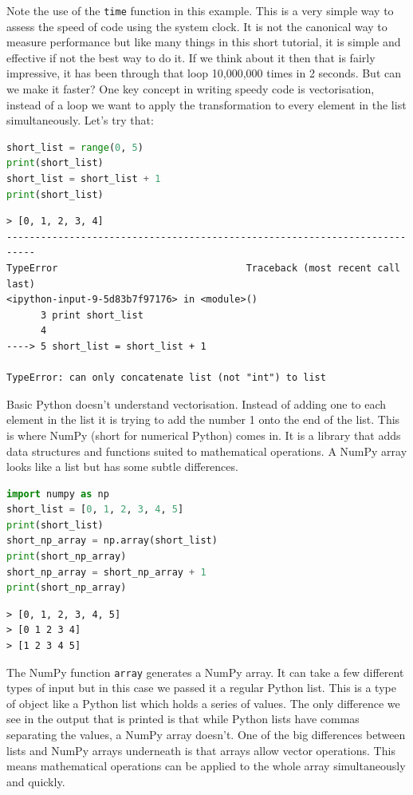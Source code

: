 	Note the use of the \texttt{time} function in this example. This is a very simple way to assess the speed of code using the system clock. It is not the canonical way to measure performance but like many things in this short tutorial, it is simple and effective if not the best way to do it.
	If we think about it then that is fairly impressive, it has been through that loop 10,000,000 times in 2 seconds. But can we make it faster? One key concept in writing speedy code is vectorisation, instead of a loop we want to apply the transformation to every element in the list simultaneously. Let's try that:

	\begin{lstlisting}[language=Python]
short_list = range(0, 5)
print(short_list)
short_list = short_list + 1
print(short_list)\end{lstlisting}

	\begin{verbatim}
> [0, 1, 2, 3, 4]
---------------------------------------------------------------------------
TypeError                                 Traceback (most recent call last)
<ipython-input-9-5d83b7f97176> in <module>()
      3 print short_list
      4 
----> 5 short_list = short_list + 1

TypeError: can only concatenate list (not "int") to list\end{verbatim}

	Basic Python doesn't understand vectorisation. Instead of adding one to each element in the list it is trying to add the number 1 onto the end of the list. This is where NumPy (short for numerical Python) comes in. It is a library that adds data structures and functions suited to mathematical operations. A NumPy array looks like a list but has some subtle differences.

	\begin{lstlisting}[language=Python]
import numpy as np
short_list = [0, 1, 2, 3, 4, 5]
print(short_list)
short_np_array = np.array(short_list)
print(short_np_array)
short_np_array = short_np_array + 1
print(short_np_array)\end{lstlisting}

	\begin{verbatim}
> [0, 1, 2, 3, 4, 5]
> [0 1 2 3 4]
> [1 2 3 4 5]
	\end{verbatim}

	The NumPy function \texttt{array} generates a NumPy array. It can take a few different types of input but in this case we passed it a regular Python list. This is a type of object like a Python list which holds a series of values. The only difference we see in the output that is printed is that while Python lists have commas separating the values, a NumPy array doesn't. One of the big differences between lists and NumPy arrays underneath is that arrays allow vector operations. This means mathematical operations can be applied to the whole array simultaneously and quickly.

